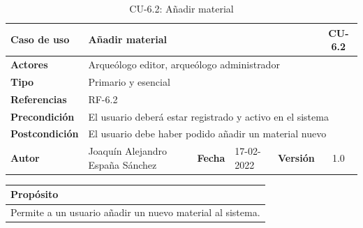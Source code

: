     \begin{table}[H]
        \begin{center}
            \begin{adjustbox}{width=\textwidth}
            \begin{tabular}{ | l | l | l | l | c | c | } 
                \hline
                \textbf{Caso de uso} & \multicolumn{4}{l|}{Añadir material} & \cellcolor{gray!50} \textbf{CU-6.2}\\
                \hline
                \textbf{Actores} & \multicolumn{5}{p{0.9\linewidth}|}{Arqueólogo editor, arqueólogo administrador} \\
                \hline
                \textbf{Tipo} & \multicolumn{5}{l|}{Primario y esencial} \\
                \hline
                \textbf{Referencias} & \multicolumn{3}{l|}{RF-6.2} & \multicolumn{2}{l|}{ }\\
                \hline
                \textbf{Precondición} & \multicolumn{5}{l|}{El usuario deberá estar registrado y activo en el sistema} \\
                \hline
                \textbf{Postcondición} & \multicolumn{5}{l|}{El usuario debe haber podido añadir un material nuevo} \\
                \hline
                \textbf{Autor} & \multicolumn{1}{p{0.25\linewidth}|}{Joaquín Alejandro España Sánchez} & \textbf{Fecha} & 
                17-02-2022     & \textbf{Versión}                                                      & 1.0\\
                \hline
            \end{tabular}
            \end{adjustbox}
            \caption{CU-6.2: Añadir material}
            \label{tab:add-material}
        \end{center}
        \end{table}

        \begin{table}[H]
            \centering
            \begin{tabularx}{\textwidth}{@{} |L |@{}} \hline
                \textbf{Propósito} \\
                \hline
                Permite a un usuario añadir un nuevo material al sistema. \\
                \hline
            \end{tabularx}
        \end{table}
    
